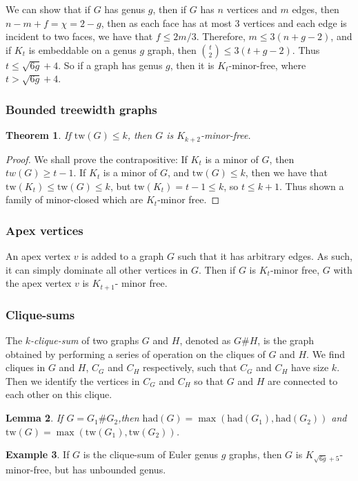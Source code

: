 \documentclass[]{article}
\newcommand{\tw}{\text{tw}}
\newcommand{\had}{\text{had}}
\newtheorem{theorem}{Theorem}
\newtheorem{lemma}[theorem]{Lemma}
\theoremstyle{definition}
\newtheorem{example}[theorem]{Example}
\numberwithin{theorem}{section}
\numberwithin{equation}{section}
\begin{document}
We can show that if $G$ has genus $g$, then if $G$ has $n$ vertices and $m$ edges, then $n - m + f = \chi = 2-g$, then as each face has at most 3 vertices and each edge is incident to two faces, we have that $f \leq 2m/3$. Therefore, $m \leq 3(n + g - 2)$, and if $K_t$ is embeddable on a genus $g$ graph, then $\binom{t}{2} \leq 3 (t + g - 2)$. Thus $t \leq \sqrt{6g} + 4$. So if a graph has genus $g$, then it is $K_t$-minor-free, where $t > \sqrt{6g} + 4$. 

\subsubsection{Bounded treewidth graphs}
\begin{theorem}
	If $\tw(G) \leq k$, then $G$ is $K_{k+2}$-minor-free. 
\end{theorem}
\begin{proof}
	We shall prove the contrapositive: If $K_t$ is a minor of $G$, then $tw(G) \geq t-1$.
	If $K_t$ is a minor of $G$, and $\tw(G) \leq k$, then we have that $\tw(K_t) \leq \tw(G) \leq k$, but $\tw(K_t) = t-1 \leq k$, so $t \leq k + 1$. Thus shown a family of minor-closed which are $K_t$-minor free. 
\end{proof}
\subsubsection{Apex vertices}
An apex vertex $v$ is added to a graph $G$ such that it has arbitrary edges. As such, it can simply dominate all other vertices in $G$. Then if $G$ is $K_t$-minor free, $G$ with the apex vertex $v$ is $K_{t+1}$- minor free. 
\subsubsection{Clique-sums}
The \textit{$k$-clique-sum} of two graphs $G$ and $H$, denoted as $G \# H$, is the graph obtained by performing a series of operation on the cliques of $G$ and $H$. We find cliques in $G$ and $H$, $C_G$ and $C_H$ respectively, such that $C_G$ and $C_H$ have size $k$. Then we identify the vertices in $C_G$ and $C_H$ so that $G$ and $H$ are connected to each other on this clique. 

\begin{lemma}
	If $G = G_1 \# G_2$,then $\had(G) = \max(\had(G_1), \had(G_2))$ and $\tw(G) = \max(\tw(G_1), \tw(G_2))$.
\end{lemma}

\begin{example}
	If $G$ is the clique-sum of Euler genus $g$ graphs, then $G$ is $K_{\sqrt{6g} + 5}$-minor-free, but has unbounded genus.
\end{example}
\end{document}
